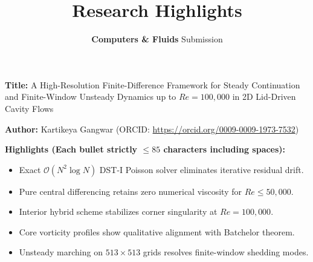 \documentclass{article}
\title{\textbf{Research Highlights}}
\author{\textbf{Computers \& Fluids} Submission}
\date{}
\begin{document}
\maketitle

\noindent\textbf{Title:} A High-Resolution Finite-Difference Framework for Steady Continuation and Finite-Window Unsteady Dynamics up to $Re = 100{,}000$ in 2D Lid-Driven Cavity Flows

\vspace{0.5em}
\noindent\textbf{Author:} Kartikeya Gangwar (ORCID: \url{https://orcid.org/0009-0009-1973-7532})

\vspace{1em}
\noindent\textbf{Highlights (Each bullet strictly $\le 85$ characters including spaces):}

\begin{itemize}
    \item Exact $\mathcal{O}(N^2 \log N)$ DST-I Poisson solver eliminates iterative residual drift.
    \item Pure central differencing retains zero numerical viscosity for $Re \le 50{,}000$.
    \item Interior hybrid scheme stabilizes corner singularity at $Re = 100{,}000$.
    \item Core vorticity profiles show qualitative alignment with Batchelor theorem.
    \item Unsteady marching on $513 \times 513$ grids resolves finite-window shedding modes.
\end{itemize}
\end{document}
